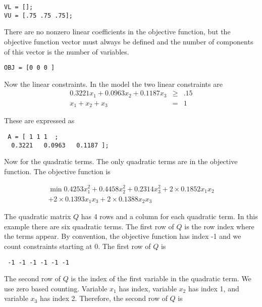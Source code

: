 \documentclass[11pt]{article}
\renewcommand{\_}{{\char"5F}}
\renewcommand{\{}{{\char"7B}}
\renewcommand{\}}{{\char"7D}}
\renewcommand{\^}{{\char"0D}}
\renewcommand{\'}{{\char"0D}}
\begin{document}
\begin{verbatim}
VL = [];
VU = [.75 .75 .75];
\end{verbatim}



There are no nonzero linear coefficients in the objective function, but the objective function vector must always be defined and the number of components of this vector is the number of variables. 



\begin{verbatim}
OBJ = [0 0 0 ]
\end{verbatim}


 Now the linear constraints.   In the model the two linear constraints are
 \begin{eqnarray*}
 0.3221 x_{1} +   0.0963x_{2} +    0.1187x_{3}  &\ge& .15 \\
x_{1} + x_{2} + x_{3} &=& 1 
 \end{eqnarray*}
 

 
 These are expressed as
 

 
 \begin{verbatim}
 A = [ 1 1 1  ;
  0.3221   0.0963   0.1187 ];
 \end{verbatim}
 

Now for the quadratic terms. The only quadratic terms are in the objective function. The objective function is


\begin{eqnarray*}
\min  0.4253 x_{1}^{2} +  0.4458 x_{2}^{2} + 0.2314 x_{3}^{2} + 2 \times 0.1852 x_{1} x_{2} \\ + 2 \times 0.1393 x_{1} x_{3} + 2 \times
 0.1388 x_{2} x_{3}
\end{eqnarray*}


 The quadratic matrix $Q$ has 4 rows and a column for each quadratic term. In this example there are six quadratic terms.  The first row of $Q$ is the row index where the terms appear. By convention, the objective function has index -1 and we count constraints starting at 0.  The first row of $Q$ is

 
 \begin{verbatim}
 -1 -1 -1 -1 -1 -1
 \end{verbatim}

The second row of $Q$ is the index of the first variable in the quadratic term. We use zero based counting.  Variable $x_{1}$ has index, variable  $x_{2}$ has index 1, and variable $x_{3}$ has index 2.  Therefore, the second row of $Q$ is
\end{document}
